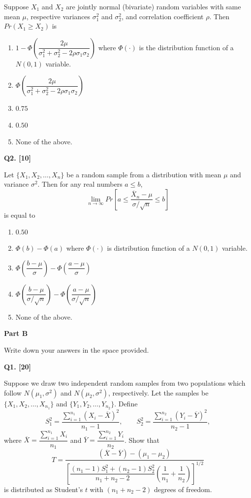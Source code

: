\documentclass[11pt]{article}
\begin{document}
Suppose $X_1$ and $X_2$ are jointly normal (bivariate) random variables with same mean $\mu$, respective variances $\sigma_1^2$ and $\sigma_2^2$, and correlation coefficient $\rho$. Then $Pr(X_1\geq X_2)$ is
\begin{enumerate}
\setlength{\itemsep}{0pt}\setlength{\parsep}{0pt}\setlength{\topsep}{2pt}
\item[(a)] $1-\Phi\!\left(\dfrac{2\mu}{\sigma_1^2+\sigma_2^2-2\rho\sigma_1\sigma_2}\right)$ where $\Phi(\cdot)$ is the distribution function of a $N(0,1)$ variable.
\item[(b)] $\Phi\!\left(\dfrac{2\mu}{\sigma_1^2+\sigma_2^2-2\rho\sigma_1\sigma_2}\right)$
\item[(c)] $0.75$
\item[(d)] $0.50$
\item[(e)] None of the above.
\end{enumerate}

\medskip

\textbf{Q2. [10]}

Let $\{X_1,X_2,\ldots,X_n\}$ be a random sample from a distribution with mean $\mu$ and variance $\sigma^2$. Then for any real numbers $a\leq b$,
\[
\lim_{n\to\infty}Pr\!\left[a\leq\frac{\overline{X}_n-\mu}{\sigma/\sqrt{n}}\leq b\right]
\]
is equal to
\begin{enumerate}
\setlength{\itemsep}{0pt}\setlength{\parsep}{0pt}\setlength{\topsep}{2pt}
\item[(a)] $0.50$
\item[(b)] $\Phi(b)-\Phi(a)$ where $\Phi(\cdot)$ is distribution function of a $N(0,1)$ variable.
\item[(c)] $\Phi\!\left(\dfrac{b-\mu}{\sigma}\right)-\Phi\!\left(\dfrac{a-\mu}{\sigma}\right)$
\item[(d)] $\Phi\!\left(\dfrac{b-\mu}{\sigma/\sqrt{n}}\right)-\Phi\!\left(\dfrac{a-\mu}{\sigma/\sqrt{n}}\right)$
\item[(e)] None of the above.
\end{enumerate}

\clearpage

\begin{center}
\textbf{Part B}
\end{center}

Write down your answers in the space provided.

\textbf{Q1. [20]}

Suppose we draw two independent random samples from two populations which follow $N(\mu_1,\sigma^2)$ and $N(\mu_2,\sigma^2)$, respectively. Let the samples be $\{X_1,X_2,\ldots,X_{n_1}\}$ and $\{Y_1,Y_2,\ldots,Y_{n_2}\}$. Define
\[
S_1^2=\frac{\sum_{i=1}^{n_1}(X_i-\overline{X})^2}{n_1-1},
\qquad
S_2^2=\frac{\sum_{i=1}^{n_2}(Y_i-\overline{Y})^2}{n_2-1},
\]
where $\overline{X}=\dfrac{\sum_{i=1}^{n_1}X_i}{n_1}$ and $\overline{Y}=\dfrac{\sum_{i=1}^{n_2}Y_i}{n_2}$. Show that
\[
T=\frac{(\overline{X}-\overline{Y})-(\mu_1-\mu_2)}
{\left[\dfrac{(n_1-1)S_1^2+(n_2-1)S_2^2}{n_1+n_2-2}
\left(\dfrac{1}{n_1}+\dfrac{1}{n_2}\right)\right]^{1/2}}
\]
is distributed as Student's $t$ with $(n_1+n_2-2)$ degrees of freedom.
\end{document}
